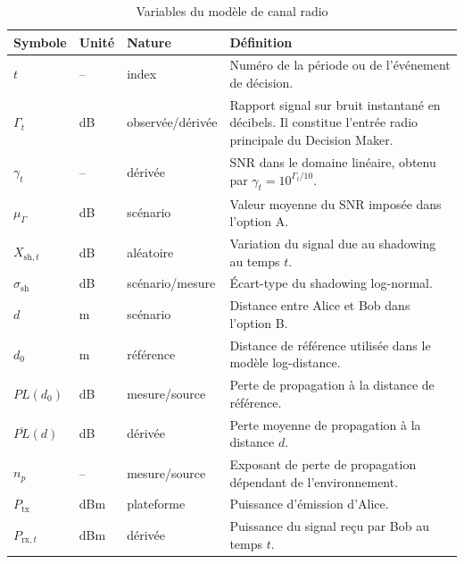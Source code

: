 \documentclass[conference,a4paper]{IEEEtran}
\begin{document}
\begin{table}[H]
\centering
\caption{Variables du modèle de canal radio}
\label{tab:variables_canal}
\renewcommand{\arraystretch}{1.15}
\begin{tabular}{p{1.7cm} p{1.8cm} p{3.0cm} p{8.0cm}}
\hline
\textbf{Symbole} &
\textbf{Unité} &
\textbf{Nature} &
\textbf{Définition} \\
\hline

$t$
& -- & index
& Numéro de la période ou de l'événement de décision. \\

$\Gamma_t$
& dB & observée/dérivée
& Rapport signal sur bruit instantané en décibels. Il constitue
l'entrée radio principale du Decision Maker. \\

$\gamma_t$
& -- & dérivée
& SNR dans le domaine linéaire, obtenu par
$\gamma_t=10^{\Gamma_t/10}$. \\

$\mu_{\Gamma}$
& dB & scénario
& Valeur moyenne du SNR imposée dans l'option A. \\

$X_{\mathrm{sh},t}$
& dB & aléatoire
& Variation du signal due au shadowing au temps $t$. \\

$\sigma_{\mathrm{sh}}$
& dB & scénario/mesure
& Écart-type du shadowing log-normal. \\

$d$
& m & scénario
& Distance entre Alice et Bob dans l'option B. \\

$d_0$
& m & référence
& Distance de référence utilisée dans le modèle log-distance. \\

$PL(d_0)$
& dB & mesure/source
& Perte de propagation à la distance de référence. \\

$\overline{PL}(d)$
& dB & dérivée
& Perte moyenne de propagation à la distance $d$. \\

$n_p$
& -- & mesure/source
& Exposant de perte de propagation dépendant de l'environnement. \\

$P_{\mathrm{tx}}$
& dBm & plateforme
& Puissance d'émission d'Alice. \\

$P_{\mathrm{rx},t}$
& dBm & dérivée
& Puissance du signal reçu par Bob au temps $t$. \\


\end{tabular}
\end{table}
\end{document}
